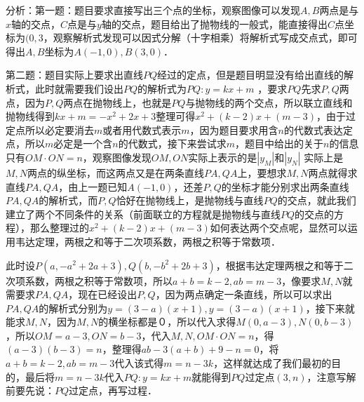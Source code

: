 \begin{solution}
    分析：第一题：题目要求直接写出三个点的坐标，观察图像可以发现\(A,B\)两点是与\(x\)轴的交点，\(C\)点是与\(y\)轴的交点，题目给出了抛物线的一般式，能直接得出\(C\)点坐标为\((0,3\)，观察解析式发现可以因式分解（十字相乘）将解析式写成交点式，即可得出\(A,B\)坐标为\(A(-1,0),B(3,0)\)．
    
    第二题：题目实际上要求出直线\(PQ\)经过的定点，但是题目明显没有给出直线的解析式，此时就需要我们设出\(PQ\)的解析式为\(PQ:y=kx+m\) ，要求\(PQ\)先求\(P,Q\)两点，因为\(P,Q\)两点在抛物线上，也就是\(PQ\)与抛物线的两个交点，所以联立直线和抛物线得到\(kx+m=-x^2+2x+3\)整理可得\(x^2+(k-2)x+(m-3)\)，由于过定点所以必定要消去\(m\)或者用代数式表示\(m\)，因为题目要求用含\(n\)的代数式表达定点，所以\(m\)必定是一个含\(n\)的代数式，接下来尝试求\(m\)，题目中给出的关于\(n\)的信息只有\(OM \cdot ON = n \)，观察图像发现\(OM,ON\)实际上表示的是\(|y_M|\)和\(|y_N|\) 实际上是\(M,N\)两点的纵坐标，而这两点又是在两条直线\(PA,QA\)上，要想求\(M,N\)两点就得求直线\(PA,QA\)，由上一题已知\(A(-1,0)\)，还差\(P,Q\)的坐标才能分别求出两条直线\(PA,QA\)的解析式，而\(P,Q\)恰好在抛物线上，是抛物线与直线\(PQ\)的交点，就此我们建立了两个不同条件的关系（前面联立的方程就是抛物线与直线\(PQ\)的交点的方程），那么整理过的\(x^2+(k-2)x+(m-3)\)如何表达两个交点呢，显然可以运用韦达定理，两根之和等于二次项系数，两根之积等于常数项．
    
    此时设\(P(a,-a^2+2a+3),Q(b,-b^2+2b+3)\)，根据韦达定理两根之和等于二次项系数，两根之积等于常数项，所以\(a+b=k-2, ab=m-3\)，像要求\(M,N\)就需要求\(PA,QA\)，现在已经设出\(P,Q\)，因为两点确定一条直线，所以可以求出\(PA,QA\)的解析式分别为\(y=(3-a)(x+1),y=(3-a)(x+1)\)，接下来就能求\(M,N\)，因为\(M,N\)的横坐标都是０，所以代入求得\(M(0,a-3),N(0,b-3)\)，所以\(OM=a-3,ON=b-3\)，代入\( M, N, OM \cdot ON = n \)，得\((a-3)(b-3)=n\)，整理得\(ab-3(a+b)+9-n=0\)，将\(a+b=k-2, ab=m-3\)代入该式得\(m=n-3k\)，这样就达成了我们最初的目的，最后将\(m=n-3k\)代入\(PQ:y=kx+m\)就能得到\(PQ\)过定点$(3,n)$，注意写解前要先说：\(PQ\)过定点，再写过程．
\end{solution}